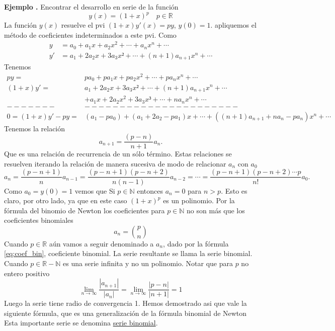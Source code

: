 \documentclass{article}
\newcounter{ejem_cont}
\newenvironment{ejemplo}[1]{\refstepcounter{ejem_cont}\vspace{1ex}\noindent\textbf{Ejemplo \arabic{ejem_cont}.} #1}{}
\newcommand{\rr}{\mathbb{R}}
\begin{document}
\begin{ejemplo}  Encontrar el desarrollo en serie de la función
\[y(x)=(1+x)^p\quad p\in\rr\]
La función $y(x)$ resuelve el pvi  $(1+x)y'(x)=py$, $y(0)=1$. apliquemos el método de coeficientes indeterminados a este pvi.
Como
\[\begin{split}
   y&=a_0+a_1x+a_2x^2+\cdots+a_nx^n+\cdots\\
   y'&=a_1+2a_2x+3a_3x²+\cdots+(n+1)a_{n+1}x^n+\cdots
  \end{split}
\]
Tenemos
\[\begin{split}
   py=&pa_0+pa_1x+pa_2x^2+\cdots+pa_nx^n+\cdots\\
  (1+x)y'=&a_1+2a_2x+3a_3x²+\cdots+(n+1)a_{n+1}x^n+\cdots\\
          &+a_1x+2a_2x^2+3a_3x³+\cdots+na_{n}x^n+\cdots\\
-------&----------------------\\
0=(1+x)y'-py =& (a_1-pa_0)+(a_1+2a_2-pa_1)x+\cdots +((n+1)a_{n+1}+na_n-pa_n)x^n+\cdots
  \end{split}
\]
Tenemos la relación
\[ a_{n+1}=\frac{(p-n)}{n+1}a_n.
\]
Que es una relación de recurrencia de un sólo término. Estas relaciones se resuelven iterando la relación de manera sucesiva de modo de relacionar $a_n$ con $a_0$
\[a_n=\frac{(p-n+1)}{n}a_{n-1}=\frac{(p-n+1)(p-n+2)}{n(n-1)}a_{n-2}=\cdots=\frac{(p-n+1)(p-n+2)\cdots p}{n!}a_0.\]
Como $a_0=y(0)=1$ vemos que
Si $p\in\mathbb{N}$ entonces $a_n=0$ para $n>p$. Esto es claro, por otro lado, ya que en este caso $(1+x)^p$ es un polinomio. Por la fórmula del binomio de Newton los coeficientes para $p\in \mathbb{N}$  no son más que los coeficientes binomiales
\[a_n=\binom{p}{n}\]
 Cuando $p\in\mathbb{R}$ aún vamos a seguir denominado a $a_n$, dado por la fórmula \eqref{eq:coef_bin},   coeficiente binomial. La serie resultante se llama la serie binomial. Cuando $p\in\mathbb{R}-\mathbb{N}$ es una serie infinita y no  un polinomio. Notar que para $p$ no entero positivo
\[\lim\limits_{n\to\infty}\frac{|a_{n+1}|}{|a_n|}=\lim\limits_{n\to\infty}\frac{|p-n|}{|n+1|}=1\]
Luego la serie tiene radio de convergencia 1.  Hemos demostrado asi que vale la siguiente fórmula, que es una generalización de la fórmula binomial de Newton
Esta importante serie se denomina \href{http://en.wikipedia.org/wiki/Binomial_series}{serie binomial}.



\end{ejemplo}
\end{document}
